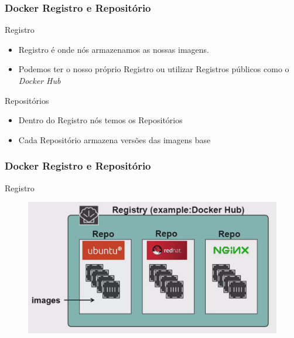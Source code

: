 \documentclass[12pt]{beamer}
\begin{document}
\begin{frame}
  \frametitle{Docker Registro e Repositório}
  \begin{block}{Registro}
    \begin{itemize}
      \item Registro é onde nós armazenamos as nossas imagens.
      \item Podemos ter o nosso próprio Registro ou utilizar Registros públicos
              como o \emph{Docker Hub}
    \end{itemize}
  \end{block}
  \begin{block}{Repositórios}
    \begin{itemize}
      \item Dentro do Registro nós temos os Repositórios
      \item Cada Repositório armazena versões das imagens base
    \end{itemize}
  \end{block}
\end{frame}
\begin{frame}
  \frametitle{Docker Registro e Repositório}
  \begin{block}{Registro}
    \begin{figure}[!h]
      \centering
      \includegraphics[width=0.6\paperwidth]{registrorepo}
    \end{figure}
  \end{block}
\end{frame}
\end{document}
